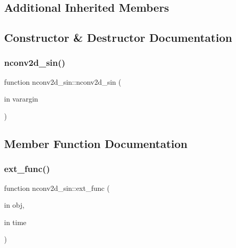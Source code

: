 \subsection*{Additional Inherited Members}


\subsection{Constructor \& Destructor Documentation}
\mbox{\label{classnconv2d__sin_a7eb9db9fedc4ba124857dae40738fb90}} 
\subsubsection{\texorpdfstring{nconv2d\+\_\+sin()}{nconv2d\_sin()}}
{\footnotesize\ttfamily function nconv2d\+\_\+sin\+::nconv2d\+\_\+sin (\begin{DoxyParamCaption}\item[{in}]{varargin }\end{DoxyParamCaption})}



\subsection{Member Function Documentation}
\mbox{\label{classnconv2d__sin_ac8e1d291292e8edc847802354d1b211b}} 
\subsubsection{\texorpdfstring{ext\+\_\+func()}{ext\_func()}}
{\footnotesize\ttfamily function nconv2d\+\_\+sin\+::ext\+\_\+func (\begin{DoxyParamCaption}\item[{in}]{obj,  }\item[{in}]{time }\end{DoxyParamCaption})\hspace{0.3cm}{\ttfamily [protected]}}

\mbox{\label{classnconv2d__sin_a97f07ebf5588db218f545f1ddd8062ec}} 
